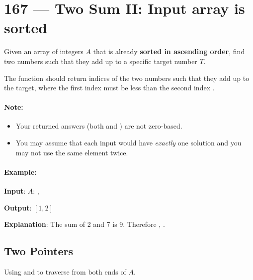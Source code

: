 \section{167 --- Two Sum II: Input array is sorted}
Given an array of integers $A$ that is already \textbf{sorted in ascending order}, find two numbers such that they add up to a specific target number $T$.

The function should return indices of the two numbers such that they add up to the target, where the first index  must be less than the second index .
\paragraph{Note:}
\begin{itemize}
    \item Your returned answers (both  and ) are not zero-based.
    \item You may assume that each input would have \textit{exactly} one solution and you may not use the same element twice.
\end{itemize}
\paragraph{Example:}
\begin{flushleft}
\textbf{Input}: $A$: \fcj{[2,7,11,15]}, 

\textbf{Output}: $[1,2]$

\textbf{Explanation}: The sum of 2 and 7 is 9. Therefore , .
\end{flushleft}

\subsection{Two Pointers}
Using  and  to traverse from both ends of $A$.
